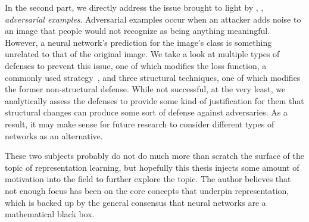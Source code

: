 In the second part, we directly address the issue brought to light by \cite{szegedy2014intriguing},
, \textit{adversarial examples}. Adversarial examples occur when an attacker adds noise to an image
that people would not recognize as being anything meaningful. However, a neural network's prediction
for the image's class is something unrelated to that of the original image.
We take a look at multiple types of defenses to prevent this issue, one of which modifies the loss
function, a commonly used strategy~\cite{goodfellow2015explaining, kannan2018adversarial,
madry2019deep}, and three structural techniques, one of which modifies the former non-structural
defense. While not successful, at the very least, we analytically assess the defenses to provide some
kind of justification for them that structural changes can produce some sort of defense against
adversaries. As a result, it may make sense for future research to consider different types of
networks as an alternative.

These two subjects probably do not do much more than scratch the surface of the topic of
representation learning, but hopefully this thesis injects some amount of motivation into the field to
further explore the topic. The author believes that not enough focus has been on the core concepts
that underpin representation, which is backed up by the general consensus that neural networks are a
mathematical black box.